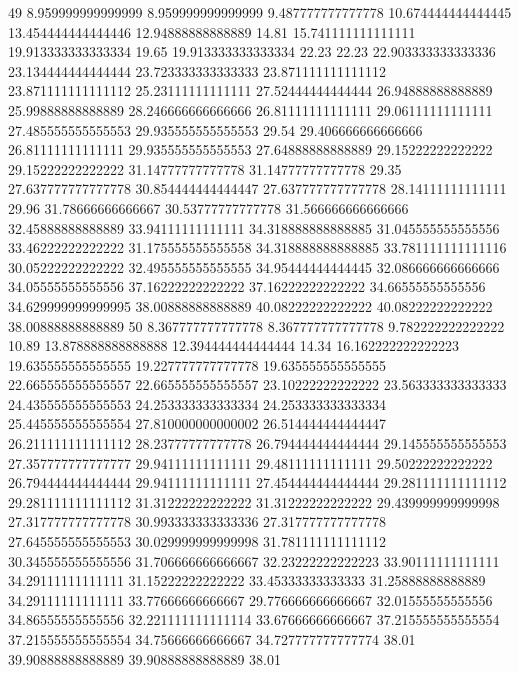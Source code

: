 49 8.959999999999999 8.959999999999999 9.487777777777778 10.674444444444445 13.454444444444446 12.94888888888889 14.81 15.741111111111111 19.913333333333334 19.65 19.913333333333334 22.23 22.23 22.903333333333336 23.134444444444444 23.723333333333333 23.871111111111112 23.871111111111112 25.23111111111111 27.52444444444444 26.94888888888889 25.99888888888889 28.246666666666666 26.81111111111111 29.06111111111111 27.485555555555553 29.935555555555553 29.54 29.406666666666666 26.81111111111111 29.935555555555553 27.64888888888889 29.15222222222222 29.15222222222222 31.14777777777778 31.14777777777778 29.35 27.637777777777778 30.854444444444447 27.637777777777778 28.14111111111111 29.96 31.78666666666667 30.53777777777778 31.566666666666666 32.45888888888889 33.94111111111111 34.318888888888885 31.045555555555556 33.46222222222222 31.175555555555558 34.318888888888885 33.781111111111116 30.05222222222222 32.495555555555555 34.95444444444445 32.086666666666666 34.05555555555556 37.16222222222222 37.16222222222222 34.66555555555556 34.629999999999995 38.00888888888889 40.08222222222222 40.08222222222222 38.00888888888889
50 8.367777777777778 8.367777777777778 9.782222222222222 10.89 13.878888888888888 12.394444444444444 14.34 16.162222222222223 19.635555555555555 19.227777777777778 19.635555555555555 22.665555555555557 22.665555555555557 23.10222222222222 23.563333333333333 24.435555555555553 24.253333333333334 24.253333333333334 25.445555555555554 27.810000000000002 26.514444444444447 26.211111111111112 28.23777777777778 26.794444444444444 29.145555555555553 27.357777777777777 29.94111111111111 29.48111111111111 29.50222222222222 26.794444444444444 29.94111111111111 27.454444444444444 29.281111111111112 29.281111111111112 31.31222222222222 31.31222222222222 29.439999999999998 27.317777777777778 30.993333333333336 27.317777777777778 27.645555555555553 30.029999999999998 31.781111111111112 30.345555555555556 31.706666666666667 32.23222222222223 33.90111111111111 34.29111111111111 31.15222222222222 33.45333333333333 31.25888888888889 34.29111111111111 33.77666666666667 29.776666666666667 32.01555555555556 34.86555555555556 32.221111111111114 33.67666666666667 37.215555555555554 37.215555555555554 34.75666666666667 34.727777777777774 38.01 39.90888888888889 39.90888888888889 38.01
